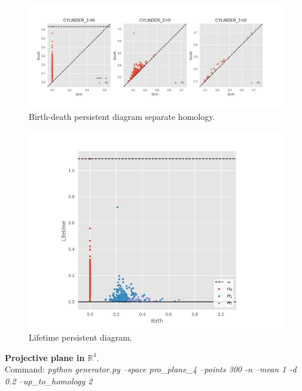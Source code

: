 \documentclass[11pt,a4paper]{report}
\begin{document}
              \begin{figure}[H]
                \centering
                \includegraphics[width=\linewidth]{./ripser/rand_cyclinder_per_homology_seperate.jpg}
                \caption{Birth-death persistent diagram separate homology.}
                \label{fig:sep hom}
              \end{figure}

              \begin{figure}[H]
                \centering
                \includegraphics[width=0.5\linewidth, scale=0.5]{./ripser/rand_cylinder_lifetime.jpg}
                \caption{Lifetime persistent diagram.}
                \label{fig:sep hom}
              \end{figure}

              \textbf{Projective plane in $\mathbb{R}^4$}.\\
              Command: \textit{python generator.py --space pro\_plane\_4 --points 300 -n --mean 1 -d 0.2 --up\_to\_homology 2}
\end{document}
